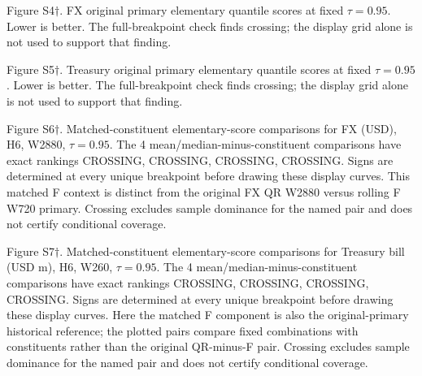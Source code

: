 \documentclass[11pt,a4paper]{article}
\begin{document}
Figure S4\(\dagger\). FX original primary elementary quantile scores at fixed \(\tau=0.95\). Lower is better. The full-breakpoint check finds crossing; the display grid alone is not used to support that finding.

Figure S5\(\dagger\). Treasury original primary elementary quantile scores at fixed \(\tau=0.95\). Lower is better. The full-breakpoint check finds crossing; the display grid alone is not used to support that finding.

Figure S6\(\dagger\). Matched-constituent elementary-score comparisons for FX (USD), H6, W2880, \(\tau=0.95\). The 4 mean/median-minus-constituent comparisons have exact rankings CROSSING, CROSSING, CROSSING, CROSSING. Signs are determined at every unique breakpoint before drawing these display curves. This matched F context is distinct from the original FX QR W2880 versus rolling F W720 primary. Crossing excludes sample dominance for the named pair and does not certify conditional coverage.

Figure S7\(\dagger\). Matched-constituent elementary-score comparisons for Treasury bill (USD m), H6, W260, \(\tau=0.95\). The 4 mean/median-minus-constituent comparisons have exact rankings CROSSING, CROSSING, CROSSING, CROSSING. Signs are determined at every unique breakpoint before drawing these display curves. Here the matched F component is also the original-primary historical reference; the plotted pairs compare fixed combinations with constituents rather than the original QR-minus-F pair. Crossing excludes sample dominance for the named pair and does not certify conditional coverage.
\end{document}
